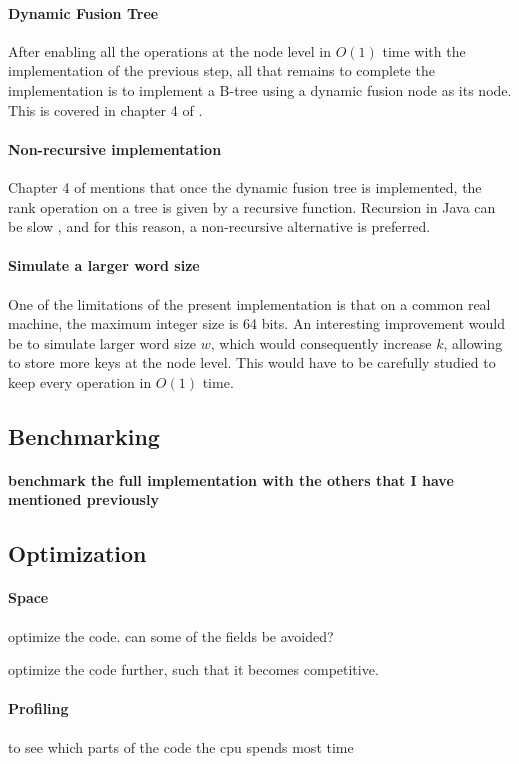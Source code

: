\paragraph*{Dynamic Fusion Tree} After enabling all the operations at the node level in $O(1)$ time with the implementation of the previous step, all that remains to complete the implementation is to implement a B-tree using a dynamic fusion node as its node. This is covered in chapter 4 of \cite{patrascu2014dynamic}.

\paragraph*{Non-recursive implementation} Chapter 4 of \cite{patrascu2014dynamic} mentions that once the dynamic fusion tree is implemented, the rank operation on a tree is given by a recursive function. Recursion in Java can be slow \cite{shirazi2003java}, and for this reason, a non-recursive alternative is preferred.

\paragraph*{Simulate a larger word size} One of the limitations of the present implementation is that on a common real machine, the maximum integer size is 64 bits. An interesting improvement would be to simulate larger word size $w$, which would consequently increase $k$, allowing to store more keys at the node level. This would have to be carefully studied to keep every operation in $O(1)$ time.

\subsection{Benchmarking}

\paragraph*{benchmark the full implementation with the others that I have mentioned previously}


\subsection{Optimization}

\paragraph*{Space} 
optimize the code. can some of the fields be avoided?

optimize the code further, such that it becomes competitive.

\paragraph*{Profiling}
to see which parts of the code the cpu spends most time
